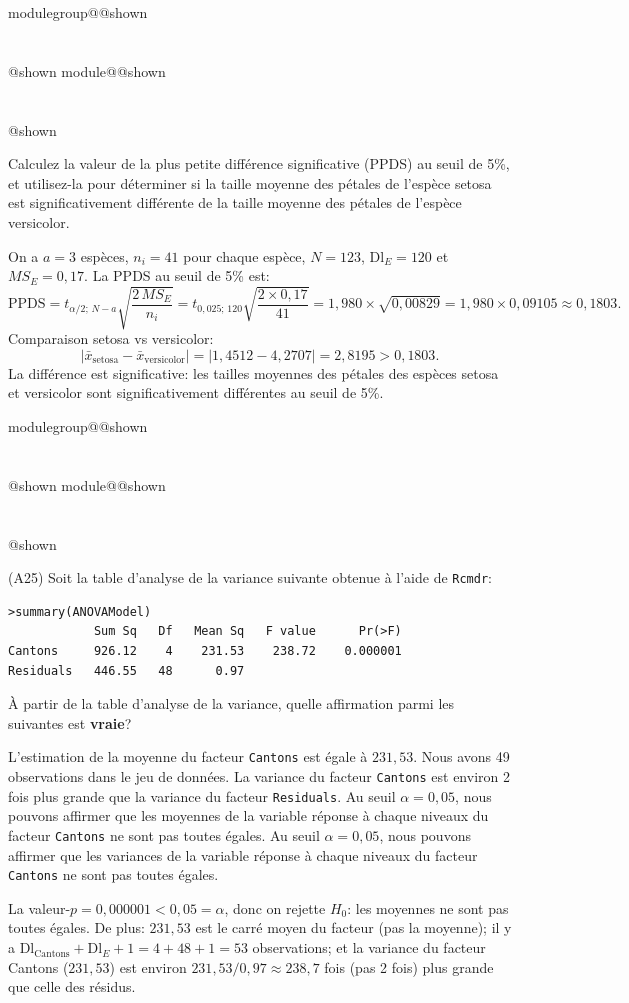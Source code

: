 \documentclass{Evaluation}
\makeatletter
\newcommand{\currentmodulekey}{}
\newcommand{\currentmoduletitle}{}
\newcommand{\currentgroupkey}{}
\newcommand{\currentgrouptitle}{}
\newcommand{\showmoduleifneeded}{%
  \ifx\currentgroupkey\empty\else
    \expandafter\ifx\csname modulegroup@\currentgroupkey @shown\endcsname\relax
      \section*{\currentgrouptitle}%
      \expandafter\gdef\csname modulegroup@\currentgroupkey @shown\endcsname{1}%
    \fi
  \fi
  \expandafter\ifx\csname module@\currentmodulekey @shown\endcsname\relax
    \section*{\currentmoduletitle}%
    \expandafter\gdef\csname module@\currentmodulekey @shown\endcsname{1}%
  \fi
}
\newenvironment{A25}{\showmoduleifneeded}{}
\makeatother
\begin{document}
\begin{questions}
\begin{A25}
Calculez la valeur de la plus petite différence significative (PPDS) au seuil de 5\%, et utilisez-la 
pour déterminer si la taille moyenne des pétales de l'espèce setosa est significativement différente de la taille
moyenne des pétales de l'espèce versicolor.

\begin{solution}
On a $a=3$ espèces, $n_i=41$ pour chaque espèce, $N=123$, $\text{Dl}_E=120$ et $MS_E=0{,}17$. La PPDS au seuil de 5\% est:
$$\text{PPDS} = t_{\alpha/2;\,N-a}\sqrt{\frac{2\,MS_E}{n_i}} = t_{0{,}025;\,120}\sqrt{\frac{2 \times 0{,}17}{41}} = 1{,}980 \times \sqrt{0{,}00829} = 1{,}980 \times 0{,}09105 \approx 0{,}1803.$$
Comparaison setosa vs versicolor:
$$|\bar{x}_{\text{setosa}} - \bar{x}_{\text{versicolor}}| = |1{,}4512 - 4{,}2707| = 2{,}8195 > 0{,}1803.$$
La différence est significative: les tailles moyennes des pétales des espèces setosa et versicolor sont significativement différentes au seuil de 5\%.
\end{solution}
\end{A25}


\begin{A25}
\question (A25) Soit la table d'analyse de la variance suivante obtenue à l'aide de \texttt{Rcmdr}:
\begin{verbatim}
>summary(ANOVAModel)
            Sum Sq   Df   Mean Sq   F value      Pr(>F)    
Cantons     926.12    4    231.53    238.72    0.000001 
Residuals   446.55   48      0.97
\end{verbatim}

À partir de la table d'analyse de la variance, quelle affirmation parmi les suivantes est \textbf{vraie}?



\begin{checkboxes}
\choice L'estimation de la moyenne du facteur \texttt{Cantons} est égale à $231,53$. 
\choice Nous avons 49 observations dans le jeu de données.
\choice La variance du facteur \texttt{Cantons} est environ 2 fois plus grande que la variance du facteur \texttt{Residuals}.
\correctchoice Au seuil $\alpha=0,05$, nous pouvons affirmer que les moyennes de la variable réponse à chaque niveaux du facteur \texttt{Cantons} ne sont pas toutes égales.
\choice Au seuil $\alpha=0,05$, nous pouvons affirmer que les variances de la variable réponse à chaque niveaux du facteur \texttt{Cantons} ne sont pas toutes égales.
\end{checkboxes}

\begin{solution}
La valeur-$p = 0{,}000001 < 0{,}05 = \alpha$, donc on rejette $H_0$: les moyennes ne sont pas toutes égales. De plus: $231{,}53$ est le carré moyen du facteur (pas la moyenne); il y a $\text{Dl}_{\text{Cantons}}+\text{Dl}_E+1 = 4+48+1 = 53$ observations; et la variance du facteur Cantons ($231{,}53$) est environ $231{,}53/0{,}97 \approx 238{,}7$ fois (pas 2 fois) plus grande que celle des résidus.
\end{solution}
\end{A25}




\end{questions}
\end{document}
